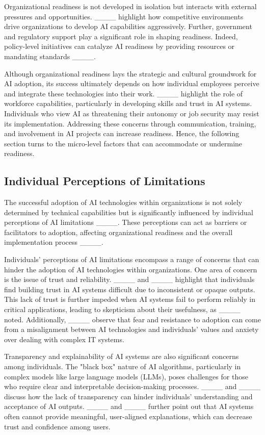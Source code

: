 Organizational readiness is not developed in isolation but interacts with external pressures and opportunities. ____ highlight how competitive environments drive organizations to develop AI capabilities aggressively. Further, government and regulatory support play a significant role in shaping readiness. Indeed, policy-level initiatives can catalyze AI readiness by providing resources or mandating standards ____.

Although organizational readiness lays the strategic and cultural groundwork for AI adoption, its success ultimately depends on how individual employees perceive and integrate these technologies into their work. ____ highlight the role of workforce capabilities, particularly in developing skills and trust in AI systems. Individuals who view AI as threatening their autonomy or job security may resist its implementation. Addressing these concerns through communication, training, and involvement in AI projects can increase readiness. Hence, the following section turns to the micro-level factors that can accommodate or undermine readiness.


\subsection{Individual Perceptions of Limitations}


The successful adoption of AI technologies within organizations is not solely determined by technical capabilities but is significantly influenced by individual perceptions of AI limitations ____. These perceptions can act as barriers or facilitators to adoption, affecting organizational readiness and the overall implementation process ____.

Individuals' perceptions of AI limitations encompass a range of concerns that can hinder the adoption of AI technologies within organizations. One area of concern is the issue of trust and reliability. ____ and ____ highlight that individuals find building trust in AI systems difficult due to inconsistent or opaque outputs. This lack of trust is further impeded when AI systems fail to perform reliably in critical applications, leading to skepticism about their usefulness, as ____ noted. Additionally, ____ observe that fear and resistance to adoption can come from a misalignment between AI technologies and individuals' values and anxiety over dealing with complex IT systems.

Transparency and explainability of AI systems are also significant concerns among individuals. The "black box" nature of AI algorithms, particularly in complex models like large language models (LLMs), poses challenges for those who require clear and interpretable decision-making processes. ____ and ____ discuss how the lack of transparency can hinder individuals' understanding and acceptance of AI outputs. ____ and ____ further point out that AI systems often cannot provide meaningful, user-aligned explanations, which can decrease trust and confidence among users.

